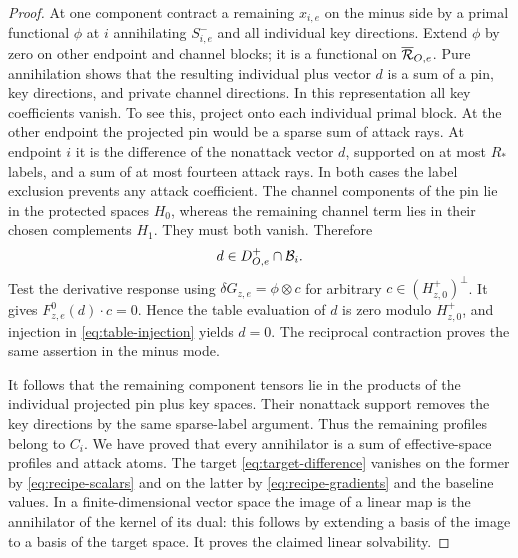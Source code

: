 \begin{proof}
At one component contract a remaining $x_{i,e}$ on the minus
side by a primal functional $\phi$ at $i$ annihilating
$S_{i,e}^-$ and all individual key directions.  Extend $\phi$
by zero on other endpoint and channel blocks; it is a
functional on $\overline{\mathcal R}_{O,e}$.  Pure annihilation shows
that the resulting individual plus vector $d$ is a sum of a
pin, key directions, and private channel directions.  In
this representation all key coefficients vanish.  To see
this, project onto each individual primal block.  At the
other endpoint the projected pin would be a sparse sum of
attack rays.  At endpoint $i$ it is the difference of the
nonattack vector $d$, supported on at most $R_*$ labels, and
a sum of at most fourteen attack rays.  In both cases the
label exclusion prevents any attack coefficient.  The
channel components of the pin lie in the protected spaces
$H_0$, whereas the remaining channel term lies in their
chosen complements $H_1$.  They must both vanish.  Therefore
\[
 d\in D_{O,e}^+\cap\mathcal B_i.
\]
Test the derivative response using
$\delta G_{z,e}=\phi\otimes c$ for arbitrary
$c\in(H_{z,0}^+)^\perp$.  It gives
$F_{z,e}^0(d)\cdot c=0$.  Hence the table evaluation of $d$
is zero modulo $H_{z,0}^+$, and injection in
\eqref{eq:table-injection} yields $d=0$.
The reciprocal contraction proves the same assertion in the
minus mode.

It follows that the remaining component tensors lie in the
products of the individual projected pin plus key spaces.
Their nonattack support removes the key directions by the
same sparse-label argument.  Thus the remaining profiles
belong to $C_i$.  We have proved that every annihilator is a
sum of effective-space profiles and attack atoms.  The target
\eqref{eq:target-difference} vanishes on the former by
\eqref{eq:recipe-scalars} and on the latter by
\eqref{eq:recipe-gradients} and the baseline values.
In a finite-dimensional vector space the image of a linear
map is the annihilator of the kernel of its dual: this
follows by extending a basis of the image to a basis of the
target space.  It proves the claimed linear solvability.


\end{proof}
